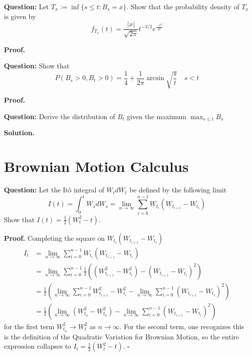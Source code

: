 \documentclass{article}
\begin{document}
\begin{tcolorbox}[colframe=black,colback=gray!5,boxrule=0.5pt]
    \textbf{Question:} Let $T_x :=\inf\{s\leq t: B_s=x\}$. Show that the probability density of $T_x$ is given by
    $$f_{T_x}(t) = \frac{|x|}{\sqrt{2\pi}} t^{-3/2} e^{\frac{-x^2}{2t}}$$
\end{tcolorbox}
\textbf{Proof.}


\begin{tcolorbox}[colframe=black,colback=gray!5,boxrule=0.5pt]
    \textbf{Question:} Show that 
    $$P(B_s>0,B_t>0) = \frac{1}{4} + \frac{1}{2\pi}\arcsin{\sqrt{\frac{s}{t}}} \quad s<t$$
\end{tcolorbox}
\textbf{Proof.}


\begin{tcolorbox}[colframe=black,colback=gray!5,boxrule=0.5pt]
    \textbf{Question:} Derive the distribution of $B_t$  given the maximum $\max_{s\leq t} B_s$
\end{tcolorbox}
\textbf{Solution.}


\newpage
\section{Brownian Motion Calculus}

\begin{tcolorbox}[colframe=black,colback=gray!5,boxrule=0.5pt]
\textbf{Question:} Let the Itô integral of $W_tdW_t$ be defined by the following limit
$$I(t) = \int_0^tW_sdW_s = \lim_{n\to\infty}\sum_{i=0}^{n-1}W_{t_i}(W_{t_{i+1}} - W_{t_i})$$
Show that $I(t) = \frac{1}{2}(W_t^2-t)$.
\end{tcolorbox}
\textbf{Proof.} Completing the square on $W_{t_i}(W_{t_{i+1}} - W_{t_i})$
\begin{align*}
    I_t &= \lim_{n\to\infty}\sum_{i=0}^{n-1}W_{t_i}(W_{t_{i+1}} - W_{t_i}) \\
    &= \lim_{n\to\infty}\sum_{i=0}^{n-1}\frac{1}{2}((W_{t_{i+1}}^2-W_{t_i}^2) - (W_{t_{i+1}} - W_{t_i})^2) \\
    &= \frac{1}{2}\left(\lim_{n\to\infty}\sum_{i=0}^{n-1}W_{t_{i+1}}^2-W_{t_i}^2 - \lim_{n\to\infty}\sum_{i=0}^{n-1}(W_{t_{i+1}}-W_{t_i})^2\right) \\
    &= \frac{1}{2}\left(\lim_{n\to\infty}(W_{t_n}^2 - W_{t_0}^2) -  \lim_{n\to\infty}\sum_{i=0}^{n-1}(W_{t_{i+1}}-W_{t_i})^2\right)
\end{align*}
for the first term $W_{t_n}^2\to W_t^2$ as $n\to\infty$. For the second term, one recognizes this is the definition of the Quadratic Variation for Brownian Motion, so the entire expression collapses to $I_t = \frac{1}{2}(W_t^2-t)$. $\square$
\end{document}
